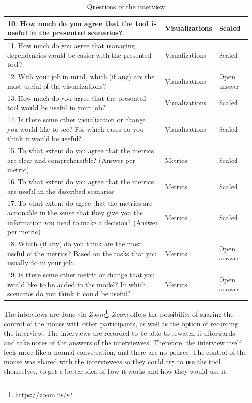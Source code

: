 \begin{table}[p]
\begin{center}
\begin{tabularx}{\textwidth}{|X|l|l|}
    \hline
    10.	How much do you agree that the tool is useful in the presented scenarios? & Visualizations & Scaled \\\hline
    11.	How much do you agree that managing dependencies would be easier with the presented tool? & Visualizations & Scaled \\\hline
    12.	With your job in mind, which (if any) are the most useful of the visualizations? & Visualizations & Open answer \\\hline
    13.	How much do you agree that the presented tool would be useful in your job? & Visualizations & Scaled \\\hline
    14.	Is there some other visualization or change you would like to see? For which cases do you think it would be useful? & Visualizations & Scaled \\\hline
    \hline
    15.	To what extent do you agree that the metrics are clear and comprehensible? (Answer per metric) & Metrics & Scaled \\\hline
    16.	To what extent do you agree that the metrics are useful in the described scenarios & Metrics & Scaled \\\hline
    17.	To what extent do agree that the metrics are actionable in the sense that they give you the information you need to make a decision? (Answer per metric) & Metrics & Scaled \\\hline
    18.	Which (if any) do you think are the most useful of the metrics? Based on the tasks that you usually do in your job. & Metrics & Open answer \\\hline
    19.	Is there some other metric or change that you would like to be added to the model? In which scenarios do you think it could be useful? & Metrics & Open answer \\\hline
    \end{tabularx}
    \end{center}
    \caption{Questions of the interview}
    \label{table:interview-questions}
\end{table}

The interviews are done via \textit{Zoom}\footnote{\url{https://zoom.us/}}. \textit{Zoom} offers the possibility of sharing the control of the mouse with other participants, as well as the option of recording the interview. The interviews are recorded to be able to rewatch it afterwards and take notes of the answers of the interviewees. Therefore, the interview itself feels more like a normal conversation, and there are no pauses. The control of the mouse was shared with the interviewees so they could try to use the tool themselves, to get a better idea of how it works and how they would use it.

